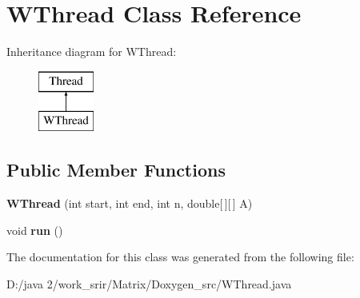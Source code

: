 \hypertarget{class_w_thread}{}\section{W\+Thread Class Reference}
\label{class_w_thread}
Inheritance diagram for W\+Thread\+:\begin{figure}[H]
\begin{center}
\leavevmode
\includegraphics[height=2.000000cm]{class_w_thread}
\end{center}
\end{figure}
\subsection*{Public Member Functions}
\begin{DoxyCompactItemize}
\item 
\hypertarget{class_w_thread_afec76e07756953171b637b156f481830}{}{\bfseries W\+Thread} (int start, int end, int n, double\mbox{[}$\,$\mbox{]}\mbox{[}$\,$\mbox{]} A)\label{class_w_thread_afec76e07756953171b637b156f481830}

\item 
\hypertarget{class_w_thread_a961e88e950dcd5388bd47bb94a738127}{}void {\bfseries run} ()\label{class_w_thread_a961e88e950dcd5388bd47bb94a738127}

\end{DoxyCompactItemize}


The documentation for this class was generated from the following file\+:\begin{DoxyCompactItemize}
\item 
D\+:/java 2/work\+\_\+srir/\+Matrix/\+Doxygen\+\_\+src/W\+Thread.\+java\end{DoxyCompactItemize}
